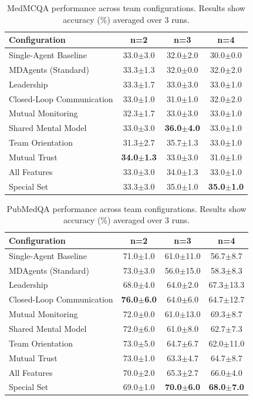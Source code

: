 \documentclass[letterpaper]{article} %
\begin{document}
\begin{table}[htbp]
\centering
\caption{MedMCQA performance across team configurations. Results show accuracy (\%) averaged over 3 runs.}
\label{tab:medmcqa_results}
\scriptsize
\begin{tabular}{l|ccc}
\hline
\textbf{Configuration} & \textbf{n=2} & \textbf{n=3} & \textbf{n=4} \\
\hline
Single-Agent Baseline & 33.0$\pm$3.0 & 32.0$\pm$2.0 & 30.0$\pm$0.0 \\
MDAgents (Standard) & 33.3$\pm$1.3 & 32.0$\pm$0.0 & 32.0$\pm$2.0 \\
Leadership & 33.3$\pm$1.7 & 33.0$\pm$3.0 & 33.0$\pm$1.0 \\
Closed-Loop Communication & 33.0$\pm$1.0 & 31.0$\pm$1.0 & 32.0$\pm$2.0 \\
Mutual Monitoring & 32.3$\pm$1.7 & 33.0$\pm$3.0 & 33.0$\pm$1.0 \\
Shared Mental Model & 33.0$\pm$3.0 & \textbf{36.0$\pm$4.0} & 33.0$\pm$1.0 \\
Team Orientation & 31.3$\pm$2.7 & 35.7$\pm$1.3 & 33.0$\pm$1.0 \\
Mutual Trust & \textbf{34.0$\pm$1.3} & 33.0$\pm$3.0 & 31.0$\pm$1.0 \\
All Features & 33.0$\pm$3.0 & 34.0$\pm$1.3 & 33.0$\pm$1.0 \\
Special Set & 33.3$\pm$3.0 & 35.0$\pm$1.0 & \textbf{35.0$\pm$1.0} \\
\hline
\end{tabular}
\end{table}

\begin{table}[htbp]
\centering
\caption{PubMedQA performance across team configurations. Results show accuracy (\%) averaged over 3 runs.}
\label{tab:pubmedqa_results}
\scriptsize
\begin{tabular}{l|ccc}
\hline
\textbf{Configuration} & \textbf{n=2} & \textbf{n=3} & \textbf{n=4} \\
\hline
Single-Agent Baseline & 71.0$\pm$1.0 & 61.0$\pm$11.0 & 56.7$\pm$8.7 \\
MDAgents (Standard) & 73.0$\pm$3.0 & 56.0$\pm$15.0 & 58.3$\pm$8.3 \\
Leadership & 68.0$\pm$4.0 & 64.0$\pm$2.0 & 67.3$\pm$13.3 \\
Closed-Loop Communication & \textbf{76.0$\pm$6.0} & 64.0$\pm$6.0 & 64.7$\pm$12.7 \\
Mutual Monitoring & 72.0$\pm$0.0 & 61.0$\pm$13.0 & 69.3$\pm$8.7 \\
Shared Mental Model & 72.0$\pm$6.0 & 61.0$\pm$8.0 & 62.7$\pm$7.3 \\
Team Orientation & 73.0$\pm$5.0 & 64.7$\pm$6.7 & 62.0$\pm$11.0 \\
Mutual Trust & 73.0$\pm$1.0 & 63.3$\pm$4.7 & 64.7$\pm$8.7 \\
All Features & 70.0$\pm$2.0 & 65.3$\pm$2.7 & 66.0$\pm$4.0 \\
Special Set & 69.0$\pm$1.0 & \textbf{70.0$\pm$6.0} & \textbf{68.0$\pm$7.0} \\
\hline
\end{tabular}
\end{table}
\end{document}
